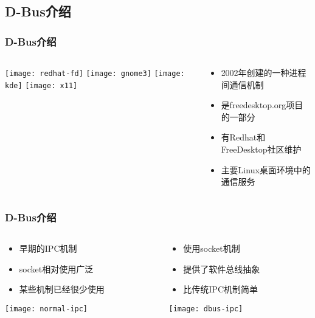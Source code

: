 \subsection{D-Bus介绍} %
\begin{frame}[fragile]
    \frametitle{D-Bus介绍}

	\begin{columns}
	\begin{column}{.4\textwidth}
		
	\texttt{[image: redhat-fd]}
	\texttt{[image: gnome3]}
	\texttt{[image: kde]}	
	\texttt{[image: x11]}
	\end{column}
	\begin{column}{.6\textwidth}
		\large
    \begin{itemize}
        \item 2002年创建的一种进程间通信机制
        \item 是freedesktop.org项目的一部分
        \item 有Redhat和FreeDesktop社区维护
		\item 主要Linux桌面环境中的通信服务
    \end{itemize}
	\end{column}
	\end{columns}
\end{frame}
\begin{frame}[fragile]
	\frametitle{D-Bus介绍}
	
	\begin{columns}
		\begin{column}{.5\textwidth}
			\begin{itemize}
			\item 早期的IPC机制
			\item socket相对使用广泛
			\item 某些机制已经很少使用
			\end{itemize}			
			\texttt{[image: normal-ipc]}
			
		\end{column}
		\pause
		\begin{column}{.5\textwidth}
			\begin{itemize}
				\item 使用socket机制
				\item 提供了软件总线抽象
				\item 比传统IPC机制简单
			\end{itemize}
			\texttt{[image: dbus-ipc]}
		\end{column}
	\end{columns}
\end{frame}

